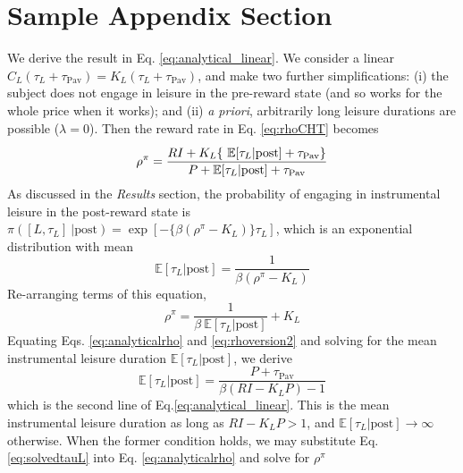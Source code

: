 \documentclass[manuscript]{stjour}
\def\taupav{\tau_{\mathrm{Pav}}}
\begin{document}







\appendix

\section{Sample Appendix Section}
We derive the result in Eq. \eqref{eq:analytical_linear}. We consider a linear $C_L(\tau_L+\taupav)=K_L(\tau_L+\taupav)$, and
make two further 
simplifications: (i) the subject does not
engage in leisure in the pre-reward state (and so works for the whole
price when it works); and (ii) \emph{a priori}, arbitrarily long leisure durations are possible
($\lambda=0$).
Then the reward rate in Eq. \eqref{eq:rhoCHT} becomes
\begin{equation}\label{eq:analyticalrho}
\rho^{\pi}= \frac{\vrule height 10pt width0pt RI + K_L \{~ \mathbb{E}[ \tau_L | \textrm{post} ] + \taupav  \} }
     {P +
\mathbb{E}[ \tau_L | \textrm{post} ] +\taupav  } 
\end{equation} 
As discussed in the \emph{Results} section, the probability of engaging in instrumental leisure in the post-reward state is $\pi([L,\tau_L]
~| \textrm{post}) = \exp\left[-\{\beta (\rho^\pi-K_L) 
 \} \tau_L\right]$, which is an exponential distribution with
mean 
\begin{equation}
\mathbb{E}[\tau_L | \textrm{post}]=\frac{1}{\beta (\rho^\pi-K_L) }
\label{eq:analyticaltauL}
\end{equation}  
Re-arranging terms of this equation,
\begin{equation}\label{eq:rhoversion2}
\rho^{\pi}=\frac{1}{\beta ~\mathbb{E}[\tau_L | \textrm{post}]} +K_L 
\end{equation} 
Equating Eqs. \eqref{eq:analyticalrho} and \eqref{eq:rhoversion2} and solving for the mean instrumental leisure duration $\mathbb{E}[\tau_L | \textrm{post}]$, we derive
\begin{equation}
\mathbb{E}[\tau_L | \textrm{post}] = \frac{P+\taupav}{\beta ( RI - K_LP)-1} 
\label{eq:solvedtauL}
\end{equation}
which is the second line of Eq.\eqref{eq:analytical_linear}. This is the mean instrumental leisure duration as long as  $RI - K_LP>1$, and  $\mathbb{E}[\tau_L | \textrm{post}] \rightarrow \infty$ otherwise. When the former condition holds, we may
substitute Eq. \eqref{eq:solvedtauL} into Eq. \eqref{eq:analyticalrho} and solve for $\rho^{\pi}$
\end{document}
